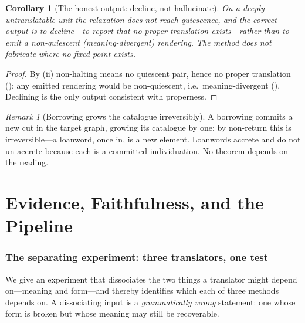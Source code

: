\documentclass[11pt,a4paper]{article}
\theoremstyle{thmstyle}
\newtheorem{corollary}[theorem]{Corollary}
\theoremstyle{definition}
\theoremstyle{remark}
\newtheorem{remark}[theorem]{Remark}
\begin{document}
\begin{corollary}[The honest output: decline, not hallucinate]
\label{cor:decline}
On a deeply untranslatable unit the relaxation does not reach quiescence, and
the correct output is to \emph{decline}---to report that no proper
translation exists---rather than to emit a non-quiescent (meaning-divergent)
rendering. The method does not fabricate where no fixed point exists.
\end{corollary}

\begin{proof}
By (ii) non-halting means no quiescent pair, hence no
proper translation (); any emitted rendering would be
non-quiescent, i.e.\ meaning-divergent ().
Declining is the only output consistent with properness.
\end{proof}

\begin{remark}[Borrowing grows the catalogue irreversibly]
\label{rem:borrow}
A borrowing commits a new cut in the target graph, growing its catalogue by
one; by non-return this is irreversible---a loanword, once in, is a new
element. Loanwords accrete and do not un-accrete because each is a committed
individuation. No theorem depends on the reading.
\end{remark}

\part{Evidence, Faithfulness, and the Pipeline}

\section{The separating experiment: three translators, one test}
\label{sec:separating}

We give an experiment that dissociates the two things a translator might
depend on---meaning and form---and thereby identifies which each of three
methods depends on. A dissociating input is a \emph{grammatically wrong}
statement: one whose form is broken but whose meaning may still be
recoverable.
\end{document}
